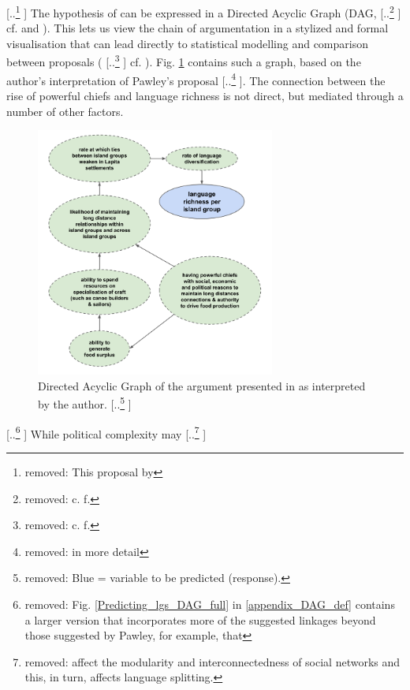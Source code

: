 \documentclass[unnumsec,webpdf,modern,medium]{oup-authoring-template}
\providecommand{\DIFaddtex}[1]{{\protect\color{blue} \sf #1}} %
\providecommand{\DIFdeltex}[1]{{\protect\color{red} [..\footnote{removed: #1} ]}} %
\providecommand{\DIFaddbegin}{} %
\providecommand{\DIFaddend}{} %
\providecommand{\DIFdelbegin}{} %
\providecommand{\DIFdelend}{} %
\providecommand{\DIFaddFL}[1]{\DIFadd{#1}} %
\providecommand{\DIFdelFL}[1]{\DIFdel{#1}} %
\providecommand{\DIFaddbeginFL}{} %
\providecommand{\DIFaddendFL}{} %
\providecommand{\DIFdelbeginFL}{} %
\providecommand{\DIFdelendFL}{} %
\providecommand{\DIFadd}[1]{\texorpdfstring{\DIFaddtex{#1}}{#1}} %
\providecommand{\DIFdel}[1]{\texorpdfstring{\DIFdeltex{#1}}{}} %
\newcommand{\DIFscaledelfig}{0.5}
\newlength{\DIFdelgraphicswidth} %
\newlength{\DIFdelgraphicsheight} %
\newcommand{\DIFaddincludegraphics}[2][]{{\color{blue}\fbox{\DIFOincludegraphics[#1]{#2}}}} %
\newcommand{\DIFdelincludegraphics}[2][]{%
\sbox{\DIFdelgraphicsbox}{\DIFOincludegraphics[#1]{#2}}%
\settoboxwidth{\DIFdelgraphicswidth}{\DIFdelgraphicsbox} %
\settoboxtotalheight{\DIFdelgraphicsheight}{\DIFdelgraphicsbox} %
\scalebox{\DIFscaledelfig}{%
\parbox[b]{\DIFdelgraphicswidth}{\usebox{\DIFdelgraphicsbox}\\[-\baselineskip] \rule{\DIFdelgraphicswidth}{0em}}\llap{\resizebox{\DIFdelgraphicswidth}{\DIFdelgraphicsheight}{%
\setlength{\unitlength}{\DIFdelgraphicswidth}%
\begin{picture}(1,1)%
\thicklines\linethickness{2pt} %
{\color[rgb]{1,0,0}\put(0,0){\framebox(1,1){}}}%
{\color[rgb]{1,0,0}\put(0,0){\line( 1,1){1}}}%
{\color[rgb]{1,0,0}\put(0,1){\line(1,-1){1}}}%
\end{picture}%
}\hspace*{3pt}}} %
} %
\DeclareRobustCommand{\DIFaddbegin}{\DIFOaddbegin \let\includegraphics\DIFaddincludegraphics} %
\DeclareRobustCommand{\DIFaddend}{\DIFOaddend \let\includegraphics\DIFOincludegraphics} %
\DeclareRobustCommand{\DIFdelbegin}{\DIFOdelbegin \let\includegraphics\DIFdelincludegraphics} %
\DeclareRobustCommand{\DIFdelend}{\DIFOaddend \let\includegraphics\DIFOincludegraphics} %
\DeclareRobustCommand{\DIFaddbeginFL}{\DIFOaddbeginFL \let\includegraphics\DIFaddincludegraphics} %
\DeclareRobustCommand{\DIFaddendFL}{\DIFOaddendFL \let\includegraphics\DIFOincludegraphics} %
\DeclareRobustCommand{\DIFdelbeginFL}{\DIFOdelbeginFL \let\includegraphics\DIFdelincludegraphics} %
\DeclareRobustCommand{\DIFdelendFL}{\DIFOaddendFL \let\includegraphics\DIFOincludegraphics} %
\begin{document}
\DIFdelbegin \DIFdel{This proposal by }\DIFdelend \DIFaddbegin \DIFadd{The hypothesis of }\DIFaddend \citet{pawley81, pawley2007} can be expressed in a Directed Acyclic Graph (DAG, \DIFdelbegin \DIFdel{c. f. }\DIFdelend \DIFaddbegin \DIFadd{cf. }\DIFaddend \citet{pearl1995causal} and \citet{mcelreath2020statistical}\DIFaddbegin \DIFadd{)}\DIFaddend . This lets us view the chain of argumentation in a stylized and formal visualisation that can lead directly to statistical modelling and comparison between proposals (\DIFdelbegin \DIFdel{c. f. }\DIFdelend \DIFaddbegin \DIFadd{cf. }\DIFaddend \citet{roberts2020chield}). Fig. \ref{Predicting_lgs_DAG_andy} contains such a graph, based on the author's interpretation of Pawley's proposal\DIFdelbegin \DIFdel{in more detail}\DIFdelend . The connection between the rise of powerful chiefs and language richness is not direct, but mediated through a number of other factors. 

\begin{figure}[ht]
\centering
\includegraphics[width=0.7\textwidth]{Predicting_lgs_DAG_andy}
\caption{Directed Acyclic Graph of the argument presented in \cite{pawley2007} \DIFaddbeginFL \DIFaddFL{as interpreted by the author}\DIFaddendFL .\DIFdelbeginFL \DIFdelFL{Blue = variable to be predicted (response).}\DIFdelendFL }
\label{Predicting_lgs_DAG_andy}
\end{figure}

\DIFdelbegin \DIFdel{Fig. \ref{Predicting_lgs_DAG_full} in \ref{appendix_DAG_def} contains a larger version that incorporates more of the suggested linkages beyond those suggested by Pawley, for example, that }\DIFdelend \DIFaddbegin \DIFadd{While }\DIFaddend political complexity may \DIFdelbegin \DIFdel{affect the modularity and interconnectedness of social networks and this, in turn, affects language splitting. 
}%
\end{document}
